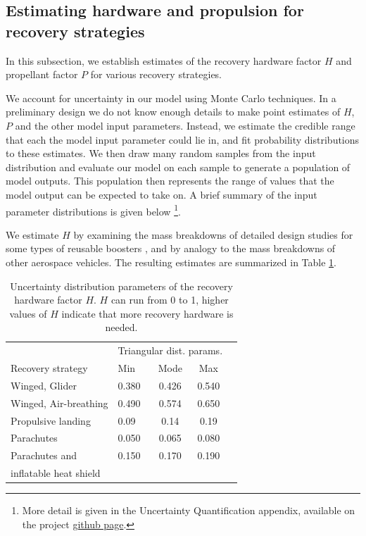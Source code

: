 \documentclass[conf]{new-aiaa}
\begin{document}
\begin{multicols}{2}
\subsection{Estimating hardware and propulsion for recovery strategies}
In this subsection, we establish estimates of the recovery hardware factor $H$ and propellant factor $P$ for various recovery strategies.

We account for uncertainty in our model using Monte Carlo techniques. In a preliminary design we do not know enough details to make point estimates of $H$, $P$ and the other model input parameters. Instead, we estimate the credible range that each the model input parameter could lie in, and fit probability distributions to these estimates. We then draw many random samples from the input distribution and evaluate our model on each sample to generate a population of model outputs. This population then represents the range of values that the model output can be expected to take on. A brief summary of the input parameter distributions is given below \footnote{More detail is given in the Uncertainty Quantification appendix, available on the project \href{https://github.com/mvernacc/lvreuse}{github page}.}.

We estimate $H$ by examining the mass breakdowns of detailed design studies for some types of reusable boosters \cite{Healy1998, Isakowitz2004, Sippel2003, Hellman2005}, and by analogy to the mass breakdowns of other aerospace vehicles. The resulting estimates are summarized in Table \ref{tab:hardware_factor_distributions}.

\begin{table}[H]
    \centering
    \caption{\label{tab:hardware_factor_distributions} Uncertainty distribution parameters of the recovery hardware factor $H$. $H$ can run from 0 to 1, higher values of $H$ indicate that more recovery hardware is needed.}
    \begin{tabular}{l l c c c}
    \hline
     & \multicolumn{3}{c}{Triangular dist. params.} \\
     Recovery strategy & Min & Mode & Max \\
    \hline
    \hline
    Winged, Glider  & 0.380 & 0.426 & 0.540 \\
    Winged, Air-breathing & 0.490 & 0.574 & 0.650 \\
    \hline
    Propulsive landing  & 0.09 & 0.14 & 0.19 \\
    \hline
    Parachutes & 0.050 & 0.065 & 0.080 \\
    Parachutes and & 0.150 & 0.170 & 0.190 \\
    \quad inflatable heat shield & & & \\
    \hline
    \end{tabular}
\end{table}


\end{multicols}
\end{document}
